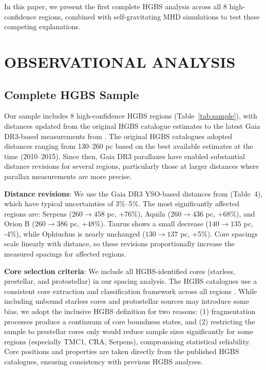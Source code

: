 \documentclass[twoside,twocolumn]{mnras}
\begin{document}
In this paper, we present the first complete HGBS analysis across all 8 high-confidence regions, combined with self-gravitating MHD simulations to test these competing explanations.

\section{OBSERVATIONAL ANALYSIS}

\subsection{Complete HGBS Sample}

Our sample includes 8 high-confidence HGBS regions (Table~\ref{tab:sample}), with distances updated from the original HGBS catalogue estimates to the latest Gaia DR3-based measurements from \citet{Zhang2023}. The original HGBS catalogues \citep{Konyves2015, Konyves2020, Andre2016, Ladjelate2020} adopted distances ranging from 130--260 pc based on the best available estimates at the time (2010--2015). Since then, Gaia DR3 parallaxes have enabled substantial distance revisions for several regions, particularly those at larger distances where parallax measurements are more precise.

\textbf{Distance revisions}: We use the Gaia DR3 YSO-based distances from \citet{Zhang2023} (Table~4), which have typical uncertainties of 3\%--5\%. The most significantly affected regions are: Serpens ($260 \to 458$ pc, +76\%), Aquila ($260 \to 436$ pc, +68\%), and Orion B ($260 \to 386$ pc, +48\%). Taurus shows a small decrease ($140 \to 135$ pc, -4\%), while Ophiuchus is nearly unchanged ($130 \to 137$ pc, +5\%). Core spacings scale linearly with distance, so these revisions proportionally increase the measured spacings for affected regions.

\textbf{Core selection criteria}: We include all HGBS-identified cores (starless, prestellar, and protostellar) in our spacing analysis. The HGBS catalogues use a consistent core extraction and classification framework across all regions \citep{Konyves2015, Konyves2020}. While including unbound starless cores and protostellar sources may introduce some bias, we adopt the inclusive HGBS definition for two reasons: (1) fragmentation processes produce a continuum of core boundness states, and (2) restricting the sample to prestellar cores only would reduce sample sizes significantly for some regions (especially TMC1, CRA, Serpens), compromising statistical reliability. Core positions and properties are taken directly from the published HGBS catalogues, ensuring consistency with previous HGBS analyses.
\end{document}
